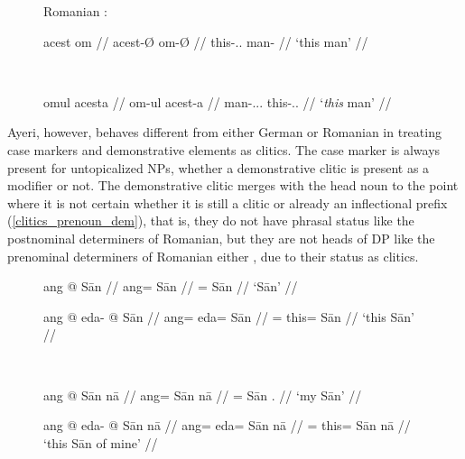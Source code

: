 \begin{figure}[h]
\ex{}\label{ex:romdef}%
	Romanian \citep[adapted from][297]{dindelegan2013}:\medskip\\
	\begin{minipage}[t]{.5\remaining}
	\tl\quad\begingl
		\gla acest om //
		\glb acest-Ø om-Ø //
		\glc this-\Pri{}.\Sg{}.\M{} man-\Sg{} //
		\glft `this man' //
	\endgl
	\end{minipage}
	~
	\begin{minipage}[t]{.5\remaining}
	\tl\quad\begingl
		\gla omul acesta //
		\glb om-ul acest-a //
		\glc man-\Def{}.\Pri{}.\Sg{}.\M{} 
			this-\Pri{}.\Sg{}.\M{} //
		\glft `\emph{this} man' //
	\endgl
	\end{minipage}
\xe
\end{figure}

Ayeri, however, behaves different from either German or Romanian in treating
case markers and demonstrative elements as clitics. The case
marker is always present for untopicalized NPs, whether a demonstrative clitic
is present as a modifier or not. The demonstrative clitic merges with the head
noun to the point where it is not certain whether it is still a clitic or
already an inflectional prefix (\autoref{clitics_prenoun_dem}), that is, they
do not have phrasal status like the postnominal determiners of Romanian, but
they are not heads of DP like the prenominal determiners of Romanian either
\citep[299]{dindelegan2013}, due to their status as clitics.

\begin{figure}[h]
\ex{}\label{ex:ayericasenoart}%
\begin{minipage}[t]{.5\remaining}%
	\tl\quad\begingl
		\gla ang @ Sān //
		\glb ang= Sān //
		\glc \Aarg{}= Sān //
		\glft `Sān' //
	\endgl\medskip

	\tl\quad\begingl
		\gla ang @ eda- @ Sān //
		\glb ang= eda= Sān //
		\glc \Aarg{}= this= Sān //
		\glft `this Sān' //
	\endgl
\end{minipage}
~
\begin{minipage}[t]{.5\remaining}%
	\tl\quad\label{ex:naaadj}\begingl
		\gla ang @ Sān nā //
		\glb ang= Sān nā //
		\glc \Aarg{}= Sān \Fsg{}.\Gen{} //
		\glft `my Sān' //
	\endgl\medskip

	\tl\quad\ljudge\ques\begingl
		\gla ang @ eda- @ Sān nā //
		\glb ang= eda= Sān nā //
		\glc \Aarg{}= this= Sān nā //
		\glft `this Sān of mine' //
	\endgl
\end{minipage}
\xe
\end{figure}

